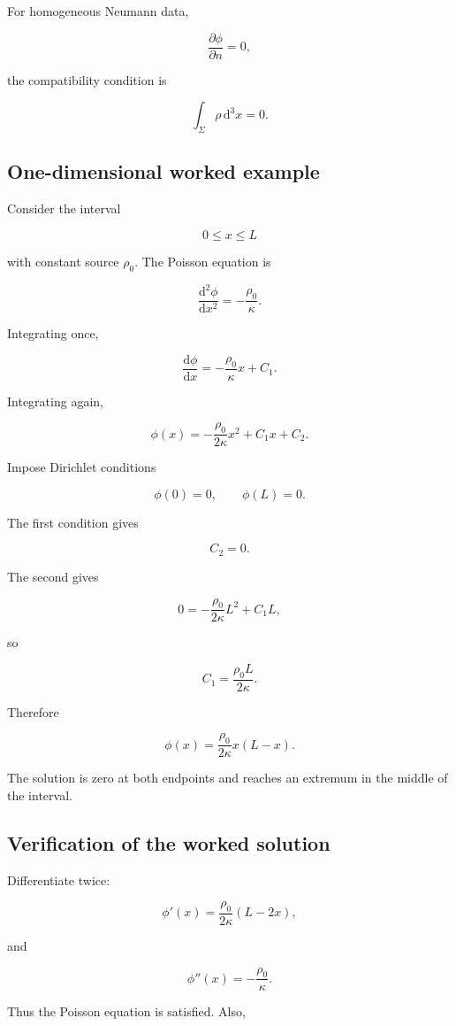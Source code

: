 For homogeneous Neumann data,

\[
\frac{\partial\phi}{\partial n}=0,
\]

the compatibility condition is

\[
\int_{\Sigma}
\rho
\,\mathrm{d}^{3}x=0.
\]

\subsection{One-dimensional worked example}

Consider the interval

\[
0\leq x\leq L
\]

with constant source \(\rho_{0}\). The Poisson equation is

\[
\frac{\mathrm{d}^{2}\phi}{\mathrm{d}x^{2}}
=
-\frac{\rho_{0}}{\kappa}.
\]

Integrating once,

\[
\frac{\mathrm{d}\phi}{\mathrm{d}x}
=
-\frac{\rho_{0}}{\kappa}x+C_{1}.
\]

Integrating again,

\[
\phi(x)
=
-\frac{\rho_{0}}{2\kappa}x^{2}
+C_{1}x+C_{2}.
\]

Impose Dirichlet conditions

\[
\phi(0)=0,
\qquad
\phi(L)=0.
\]

The first condition gives

\[
C_{2}=0.
\]

The second gives

\[
0
=
-\frac{\rho_{0}}{2\kappa}L^{2}
+C_{1}L,
\]

so

\[
C_{1}
=
\frac{\rho_{0}L}{2\kappa}.
\]

Therefore

\[
\boxed{
\phi(x)
=
\frac{\rho_{0}}{2\kappa}
x(L-x)
}.
\]

The solution is zero at both endpoints and reaches an extremum in the middle of the interval.

\subsection{Verification of the worked solution}

Differentiate twice:

\[
\phi'(x)
=
\frac{\rho_{0}}{2\kappa}(L-2x),
\]

and

\[
\phi''(x)
=
-\frac{\rho_{0}}{\kappa}.
\]

Thus the Poisson equation is satisfied. Also,


